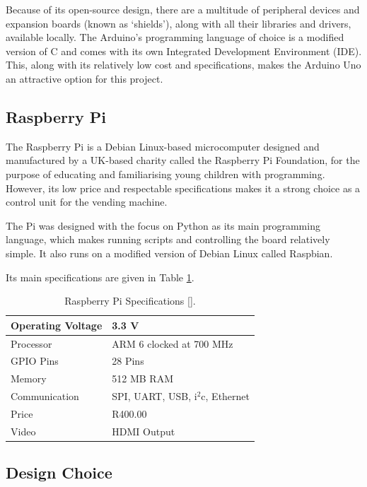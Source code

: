 Because of its open-source design, there are a multitude of peripheral devices and expansion
boards (known as `shields'), along with all their libraries and drivers,
available locally. The Arduino's programming language of choice is a modified version of
C and comes with its own Integrated Development Environment (IDE). This, along
with its relatively low cost and specifications, makes the Arduino Uno
an attractive option for this project.

\subsection{Raspberry Pi}
\label{sec:raspi}

The Raspberry Pi is a Debian Linux-based microcomputer
designed and manufactured by a UK-based charity called the Raspberry Pi Foundation, for the
purpose of educating and familiarising young children with programming. However, its low price
and respectable specifications makes it a strong choice as a control unit for the vending
machine.

The Pi was designed with the focus on Python as its main programming language, which makes
running scripts and controlling the board relatively simple. It also runs on a modified
version of Debian Linux called Raspbian.

Its main specifications are given in Table \ref{tab:rpi-specs}.

\begin{table}
\centering
\caption{Raspberry Pi Specifications [\cite{website:raspi-specs}].}
  \begin{tabular}{|l|l|}
  \hline
  Operating Voltage & 3.3 V \\\hline
  Processor & ARM 6 clocked at 700 MHz \\\hline
  GPIO Pins & 28 Pins \\\hline
  Memory & 512 MB RAM \\\hline
  Communication & SPI, UART, USB, i$^2$c, Ethernet \\\hline
  Price & R400.00 \\\hline
  Video & HDMI Output \\\hline
  \end{tabular}
  \label{tab:rpi-specs}
\end{table}

\subsection{Design Choice}

